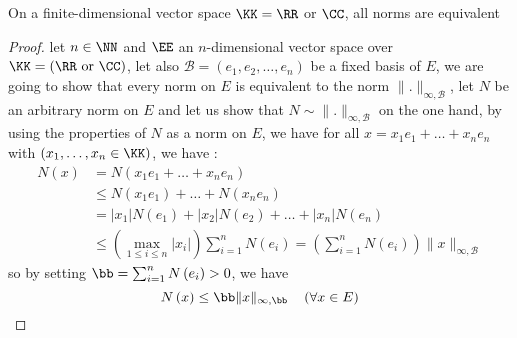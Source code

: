 \begin{theorem}[]
On a finite-dimensional vector space $\KK = \RR $ or $\CC $, all norms
are equivalent
\end{theorem}
\begin{proof}
	let $n \in \NN$ and $\EE $ an $n$-dimensional vector space over 
	$\KK = \left( \RR  \text{ or } \CC  \right)$, let 
	also $\mathcal{B} = \left( e_1,e_2, \hdots ,e_{n} \right)$  
	be a fixed basis of $E$, we are going to show that every norm on $E$ 
	is equivalent to the norm $\| . \| _{\infty ,\mathcal{B} }$, let $N$ 
	be an arbitrary norm on $E$ and let us show that 
	$N \sim \| . \| _{\infty ,\mathcal{B} }$ on the one hand, 
	by using the properties of $N$ as a norm on $E$, we have for all
	$x = x_1 e_1 + \hdots + x_{n} e_{n}$  with $\left( x_1, \hdots , x_{n} \in \KK \right)$, 
	we have : 
	\begin{align*}
		N \left( x \right) &= 
	N \left( x_1 e_1 + \hdots + x_{n}e_{n} \right) \\ 
				   &\leq 
		N \left( x_1 e_1 \right) + 
		\hdots + N \left( x_{n} e_{n} \right) \\ 
	&= \left| x_1 \right| N \left( e_1 \right) + 
	\left| x_2 \right| N \left( e_2 \right) + \hdots +
	\left| x_{n} \right| N \left( e_{n} \right) \\
	& \leq \left( \max _{1 \leq i \leq n} \left| x_{i} \right|\right) 
	\sum_{i=1}^{n} N \left( e_{i} \right) = 
	\left( \sum_{i=1}^{n} N \left( e_{i} \right) \right) 
	\| x \| _{\infty , \mathcal{B} }
	\end{align*}
	so by setting $\bb  = \sum_{i=1}^{n}N \left( e_{i} \right) > 0$, we have
	\[
	N \left( x \right) \leq 
	\bb  \| x \| _{\infty , \bb } \quad 
	\left( 
	\forall  x \in E
	\right)
	\]
	\end{proof}
% 
